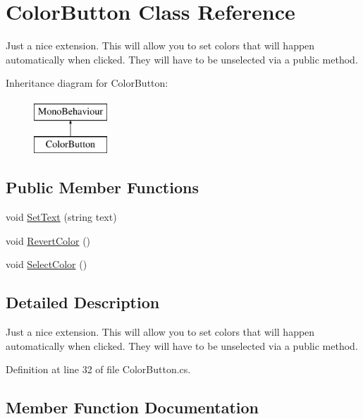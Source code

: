 \hypertarget{class_color_button}{}\section{Color\+Button Class Reference}
\label{class_color_button}


Just a nice extension. This will allow you to set colors that will happen automatically when clicked. They will have to be unselected via a public method.  


Inheritance diagram for Color\+Button\+:\begin{figure}[H]
\begin{center}
\leavevmode
\includegraphics[height=2.000000cm]{class_color_button}
\end{center}
\end{figure}
\subsection*{Public Member Functions}
\begin{DoxyCompactItemize}
\item 
void \hyperlink{class_color_button_a00897650eed8cb5e483b2e682f8ba0e5}{Set\+Text} (string text)
\item 
void \hyperlink{class_color_button_ab81d3848e969610d18dee7b884defc49}{Revert\+Color} ()
\item 
void \hyperlink{class_color_button_a0ad9ae5a492eaaa9d5f69072a5e0abf4}{Select\+Color} ()
\end{DoxyCompactItemize}


\subsection{Detailed Description}
Just a nice extension. This will allow you to set colors that will happen automatically when clicked. They will have to be unselected via a public method. 



Definition at line 32 of file Color\+Button.\+cs.



\subsection{Member Function Documentation}
\mbox{\label{class_color_button_ab81d3848e969610d18dee7b884defc49}} 
